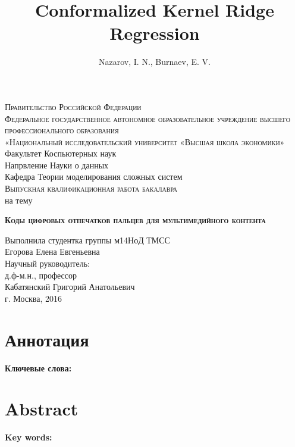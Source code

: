 \documentclass[a4paper,14pt]{extarticle}
\title{Conformalized Kernel Ridge Regression}
\author{Nazarov, I. N., Burnaev, E. V.}
\begin{document}
\thispagestyle{empty}
\begin{center}
\textsc{Правительство Российской Федерации}\\[0.2cm]
\textsc{Федеральное государственное автономное образовательное учреждение высшего
профессионального образования \\ «Национальный исследовательский университет
«Высшая школа экономики»}\\[0.7cm]
Факультет Коспьютерных наук \\[0.2cm]
Напрвление Науки о данных \\[0.2cm]
Кафедра Теории моделирования сложных систем\\[1.6cm]
\textsc{Выпускная квалификационная работа бакалавра }\\[0.7cm]
на тему\\[0.7cm]
\begin{large}
\textsc{\textbf{Коды цифровых отпечатков пальцев для мультимедийного контента}}
\end{large}
\end{center}
\vspace{2.5cm}
\begin{center}
Выполнила студентка группы м14НоД ТМСС \\
Егорова Елена Евгеньевна\\
\vspace{1.5cm}
Научный руководитель: \\
д.ф-м.н., профессор\\
Кабатянский Григорий Анатольевич\\
\vspace{1.5cm}
г. Москва, 2016
\end{center}
\newpage
{}
\tableofcontents
\newpage
{}
\section*{Аннотация}


\textbf{Ключевые слова:} 

\section*{Abstract}



\textbf{Key words:} 
\newpage


\end{document}
